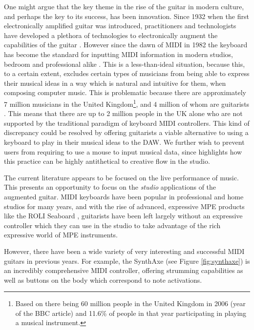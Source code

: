 One might argue that the key theme in the rise of the guitar in modern culture, and perhaps the key to its success, has been innovation. Since 1932 \citep{millard_electric_2004} when the first electronically amplified guitar was introduced, practitioners and technologists have developed a plethora of technologies to electronically augment the capabilities of the guitar \citep{lahdeoja_approach_2008}. However since the dawn of MIDI in 1982 \citep{stubbs_mars_2018} the keyboard has become the standard for inputting MIDI information in modern studios, bedroom and professional alike \citep{roads_composing_2015}. This is a less-than-ideal situation, because this, to a certain extent, excludes certain types of musicians from being able to express their musical ideas in a way which is natural and intuitive for them, when composing computer music. This is problematic because there are approximately 7 million musicians in the United Kingdom\footnote{Based on there being 60 million people \citep{datacommons_united_2020} in the United Kingdom in 2006 (year of the BBC article) and 11.6\% of people in that year participating in playing a musical instrument.}, and 4 million of whom are guitarists \citep{bbc_uk_2006}. This means that there are up to 2 million people in the UK alone who are not supported by the traditional paradigm of keyboard MIDI controllers. This kind of discrepancy could be resolved by offering guitarists a viable alternative to using a keyboard to play in their musical ideas to the DAW. We further wish to prevent users from requiring to use a mouse to input musical data, since \cite{nash_supporting_2012} highlights how this practice can be highly antithetical to creative flow in the studio.

The current literature appears to be focused on the live performance of music. This presents an opportunity to focus on the \textit{studio} applications of the augmented guitar. MIDI keyboards have been popular in professional and home studios for many years, and with the rise of advanced, expressive MPE products like the ROLI Seaboard \citep{lamb_seaboard_2014}, guitarists have been left largely without an expressive controller which they can use in the studio to take advantage of the rich expressive world of MPE instruments. 

However, there have been a wide variety of very interesting and successful MIDI guitars in previous years. For example, the SynthAxe \citep{white_guitarists_1984} (see Figure \ref{fig:synthaxe}) is an incredibly comprehensive MIDI controller, offering strumming capabilities as well as buttons on the body which correspond to note activations. 

